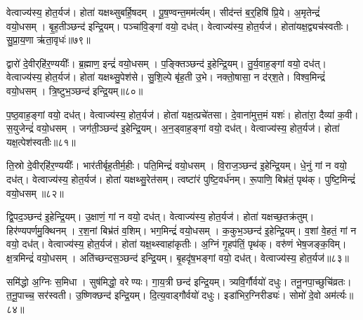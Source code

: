 वेत्वाज्य॑स्य॒ होत॒र्यज॑।
होता॑ यक्षथ्सुबर्\mbox{}हि॒षदम्।
पू॒ष॒ण्वन्त॒मम॑र्त्यम्।
सीद॑न्तं ब॒र्॒हिषि॑ प्रि॒ये।
अ॒मृतेन्द्रं॑ वयो॒धसम्।
बृ॒ह॒तीञ्छन्द॑ इन्द्रि॒यम्।
पञ्चा॑वि॒ङ्गां वयो॒ दध॑त्।
वेत्वाज्य॑स्य॒ होत॒र्यज॑।
होता॑यक्ष॒द्व्यच॑स्वतीः।
सु॒प्रा॒य॒णा ऋ॑ता॒वृधः॑॥७९॥

द्वारो॑ दे॒वीर्‌\mbox{}हि॑र॒ण्ययीः᳚।
ब्र॒ह्माण॒ इन्द्रं॑ वयो॒धसम्।
प॒ङ्क्तिञ्छन्द॑ इ॒हेन्द्रि॒यम्।
तु॒र्य॒वाह॒ङ्गां वयो॒ दध॑त्।
वेत्वाज्य॑स्य॒ होत॒र्यज॑।
होता॑ यक्षथ्सु॒पेश॑से।
सु॒शि॒ल्पे बृ॑ह॒ती उ॒भे।
नक्तो॒षासा॒ न द॑र्‌\mbox{}श॒ते।
विश्व॒मिन्द्रं॑ वयो॒धसम्।
त्रि॒ष्टुभ॒ञ्छन्द॑ इन्द्रि॒यम्॥८०॥

प॒ष्ठ॒वाह॒ङ्गां वयो॒ दध॑त्।
वेत्वाज्य॑स्य॒ होत॒र्यज॑।
होता॑ यक्ष॒त्प्रचे॑तसा।
दे॒वाना॑मुत्त॒मं यशः॑।
होता॑रा॒ दैव्या॑ क॒वी।
स॒युजेन्द्रं॑ वयो॒धसम्।
जग॑ती॒ञ्छन्द॑ इ॒हेन्द्रि॒यम्।
अ॒न॒ड्वाह॒ङ्गां वयो॒ दध॑त्।
वेत्वाज्य॑स्य॒ होत॒र्यज॑।
होता॑ यक्ष॒त्पेश॑स्वतीः॥८१॥

ति॒स्रो दे॒वीर्‌\mbox{}हि॑र॒ण्ययीः᳚।
भार॑तीर्बृह॒तीर्म॒हीः।
पति॒मिन्द्रं॑ वयो॒धसम्।
वि॒राज॒ञ्छन्द॑ इ॒हेन्द्रि॒यम्।
धे॒नुं गां न वयो॒ दध॑त्।
वेत्वाज्य॑स्य॒ होत॒र्यज॑।
होता॑ यक्षथ्सु॒रेत॑सम्।
त्वष्टा॑रं पुष्टि॒वर्ध॑नम्।
रू॒पाणि॒ बिभ्र॑तं॒ पृथ॑क्।
पुष्टि॒मिन्द्रं॑ वयो॒धसम्॥८२॥

द्वि॒पद॒ञ्छन्द॑ इ॒हेन्द्रि॒यम्।
उ॒क्षाणं॒ गां न वयो॒ दध॑त्।
वेत्वाज्य॑स्य॒ होत॒र्यज॑।
होता॑ यक्षच्छ॒तक्र॑तुम्।
हिर॑ण्य\-पर्णमु॒क्थिनम्।
र॒श॒नां बिभ्र॑तं व॒शिम्।
भग॒मिन्द्रं॑ वयो॒धसम्।
क॒कुभ॒ञ्छन्द॑ इ॒हेन्द्रि॒यम्।
व॒शां वे॒हतं॒ गां न वयो॒ दध॑त्।
वेत्वाज्य॑स्य॒ होत॒र्यज॑।
होता॑ यक्ष॒थ्स्वाहा॑कृतीः।
अ॒ग्निं गृ॒हप॑तिं॒ पृथ॑क्।
वरु॑णं भेष॒जङ्क॒विम्।
क्ष॒त्रमिन्द्रं॑ वयो॒धसम्।
अति॑च्छन्दस॒ञ्छन्द॑ इन्द्रि॒यम्।
बृ॒हदृ॑ष॒भङ्गां वयो॒ दध॑त्।
वेत्वाज्य॑स्य॒ होत॒र्यज॑॥८३॥

समि॑द्धो अ॒ग्निः स॒मिधा।
सुष॑मिद्धो॒ वरेण्यः।
गा॒य॒त्री छन्द॑ इन्द्रि॒यम्।
त्र्यवि॒र्गौर्वयो॑ दधुः।
तनू॒नपा॒च्छुचि॑व्रतः।
त॒नू॒पाच्च॒ सर॑स्वती।
उ॒ष्णिक्छन्द॑ इन्द्रि॒यम्।
दि॒त्य॒वाड्गौर्वयो॑ दधुः।
इडा॑भिर॒ग्निरीड्यः॑।
सोमो॑ दे॒वो अम॑र्त्यः॥८४॥

